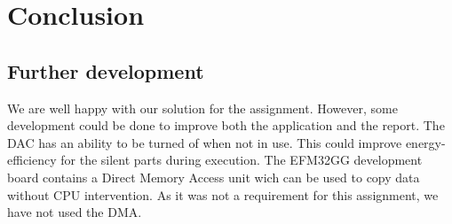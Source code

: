 \section{Conclusion}

\subsection{Further development}
We are well happy with our solution for the assignment. However, some development could be done to improve both the application and the report. The DAC has an ability to be turned of when not in use. This could improve energy-efficiency for the silent parts during execution. The EFM32GG development board contains a Direct Memory Access unit wich can be used to copy data without CPU intervention. As it was not a requirement for this assignment, we have not used the DMA.
